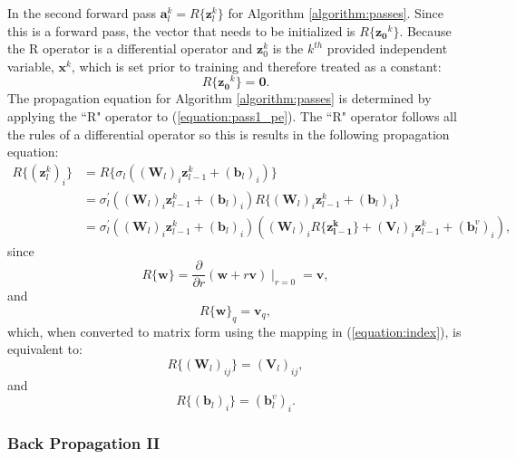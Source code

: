 \documentclass[letterpaper,12pt,titlepage,oneside,final]{book}
\begin{document}
	In the second forward pass $\mathbf{a}_{l}^{k} = R\{\mathbf{z}_{l}^{k}\}$ for Algorithm \ref{algorithm:passes}. Since this is a forward pass, the vector that needs to be initialized is $R\{\mathbf{z_{0}}^{k}\}$. Because the R operator is a differential operator and $\mathbf{z}_{0}^{k}$ is the $k^{th}$ provided independent variable, $\mathbf{x}^k$, which is set prior to training and therefore treated as a constant:
	\begin{equation}
	R\{\mathbf{z_{0}}^{k}\} = \mathbf{0}.
	\end{equation}
	The propagation equation for Algorithm \ref{algorithm:passes} is determined by applying the ``R" operator to (\ref{equation:pass1_pe}). The ``R" operator follows all the rules of a differential operator so this is results in the following propagation equation:
	\begin{equation}
	\begin{split}
	R\{(\mathbf{z}_{l}^{k})_{i}\} & = R\{\sigma_{l}((\mathbf{W}_{l})_{i}\mathbf{z}_{l-1}^{k} + (\mathbf{b}_{l})_{i})\} \\ & = 
	\sigma_{l}^{\prime}((\mathbf{W}_{l})_{i}\mathbf{z}_{l-1}^{k} + (\mathbf{b}_{l})_{i})R\{(\mathbf{W}_{l})_{i}\mathbf{z}_{l-1}^{k} + (\mathbf{b}_{l})_{i}\} \\ & = 
	\sigma_{l}^{\prime}((\mathbf{W}_{l})_{i}\mathbf{z}^{k}_{l-1}+ (\mathbf{b}_{l})_{i})((\mathbf{W}_{l})_{i}R\{\mathbf{z_{l-1}^{k}}\} + (\mathbf{V}_{l})_{i}\mathbf{z}_{l-1}^{k} + (\mathbf{b}_{l}^{v})_{i}),
	\label{equation:pass3_pe}
	\end{split}
	\end{equation}
	since
	\begin{equation}
	R\{\mathbf{w}\} = \frac{\partial}{\partial r}(\mathbf{w} + r\mathbf{v})\mid_{r=0} = \mathbf{v},
	\end{equation}
	and
	\begin{equation}
	R\{\mathbf{w}\}_{q} = \mathbf{v}_{q},
	\label{equation:RwisV}
	\end{equation}
	which, when converted to matrix form using the mapping in (\ref{equation:index}), is equivalent to:
	\begin{equation}
	R\{(\mathbf{W}_{l})_{ij}\} = (\mathbf{V}_{l})_{ij},
	\label{equation:WtoV}
	\end{equation}
	and
	\begin{equation}
	R\{(\mathbf{b}_{l})_{i}\} = (\mathbf{b}^{v}_{l})_{i}.
	\label{equation:btobv}
	\end{equation}
	
	\subsubsection{Back Propagation II}
	
\end{document}
